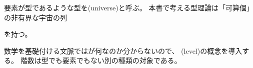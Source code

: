 \documentclass[index]{subfiles}
\begin{document}

要素が型であるような型を(universe)と呼ぶ。
本書で考える型理論は「可算個」の非有界な宇宙の列
\begin{myDisplayMath}
  \myUniverse{} \myElemOf
  \myUniverse{} \myElemOf
  \myUniverse{} \myElemOf
  \myDots
\end{myDisplayMath}
を持つ。

数学を基礎付ける文脈ではが何なのか分からないので、
(level)の概念を導入する。
階数は型でも要素でもない別の種類の対象である。


\end{document}
